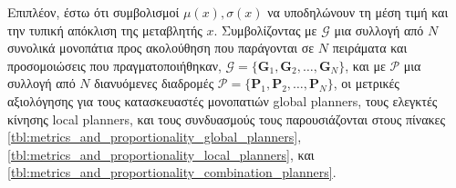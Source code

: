 Επιπλέον, έστω ότι συμβολισμοί $\mu(x),\sigma(x)$ να υποδηλώνουν τη μέση τιμή
και την τυπική απόκλιση της μεταβλητής $x$.  Συμβολίζοντας με
$\bm{\mathcal{G}}$ μια συλλογή από $N$ συνολικά μονοπάτια προς ακολούθηση που
παράγονται σε $N$ πειράματα και προσομοιώσεις που πραγματοποιήθηκαν,
$\bm{\mathcal{G}} = \{ \bm{G}_1, \bm{G}_2, \dots, \bm{G}_N \}$, και με
$\bm{\mathcal{P}}$ μια συλλογή από $N$ διανυόμενες διαδρομές $\bm{\mathcal{P}}
= \{ \bm{P}_1, \bm{P}_2, \dots, \bm{P}_N \}$, οι μετρικές αξιολόγησης για τους
κατασκευαστές μονοπατιών global planners, τους ελεγκτές κίνησης local planners,
και τους συνδυασμούς τους παρουσιάζονται στους πίνακες
\ref{tbl:metrics_and_proportionality_global_planners},
\ref{tbl:metrics_and_proportionality_local_planners}, και
\ref{tbl:metrics_and_proportionality_combination_planners}.



